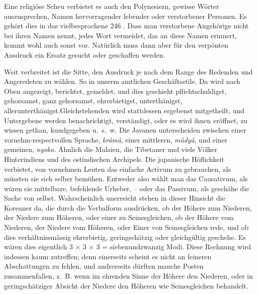 {Eine religiöse Scheu verbietet es auch den Polynesiern, gewisse \label{fp.244} Wörter auszusprechen, Namen hervorragender lebender oder verstorbener Personen. Es gehört dies in das vielbesprochene   {\textbar}{\textbar}246{\textbar}{\textbar}\label{sp.246} . Dass man verstorbene Angehörige nicht bei ihren Namen nennt, jedes Wort vermeidet, das an diese Namen erinnert, kommt wohl auch sonst vor. Natürlich muss dann aber für den verpönten Ausdruck ein Ersatz gesucht oder geschaffen werden.

Weit verbreitet ist die Sitte, den Ausdruck je nach dem Range des Redenden und Angeredeten zu wählen. So in unserm amtlichen Geschäftsstile. Da wird nach Oben angezeigt, berichtet, gemeldet, und dies geschieht pflichtschuldigst, gehorsamst, ganz gehorsamst, ehrerbietigst, unterthänigst, allerunterthänigst.\linebreak Gleichstehenden wird stattdessen ergebenst mitgetheilt, und Untergebene werden benachrichtigt, verständigt, oder es wird ihnen eröffnet, zu wissen gethan, kundgegeben u.~s.~w. Die Javanen unterscheiden zwischen einer vornehm-respect\-vollen Sprache, \textit{kråmå}, einer mittleren, \textit{mådyå}, und einer gemeinen, \textit{ngoko}. Ähnlich die Malaien, die Tibetaner und viele Völker Hinterindiens und des ostindischen Archipels.  Die japanische Höflichkeit verbietet, von vornehmen Leuten das einfache Activum zu gebrauchen, als müssten sie sich selber bemühen. Entweder also wählt man das Causativum, als wären sie mittelbare, befehlende Urheber, – oder das Passivum, als geschähe die Sache von selbst. Wahrscheinlich unerreicht stehen in dieser Hinsicht die Koreaner da, die durch die Verbalform ausdrücken, ob der Höhere zum Niederen, der Niedere zum Höheren, oder einer zu Seinesgleichen, ob der Höhere vom Niederen, der Niedere vom Höheren, oder Einer von Seinesgleichen rede, und ob dies verhältnissmässig ehrerbietig, geringschätzig oder gleichgültig geschehe. Es wären dies eigentlich 3 × 3 × 3 = siebenundzwanzig Modi. Diese Rechnung wird indessen kaum zutreffen; denn einerseits scheint es nicht an feineren Abschattungen zu fehlen, und andrerseits dürften manche Posten zusammenfallen, z.~B. wenn im ehrenden Sinne der Höhere den Niederen, oder in geringschätziger Absicht der Niedere den Höheren wie Seinesgleichen behandelt. 

}
